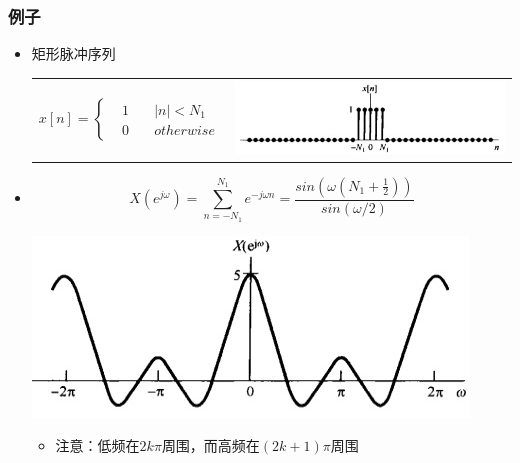 \documentclass[CJKutf8,xcolor=pdftex,dvipsnames,table]{beamer}
\begin{document}
\begin{CJK*}{UTF8}{song}
\begin{frame}
  \end{frame}   
       
  \begin{frame}
    \frametitle{例子}
    \begin{itemize}
    \item 矩形脉冲序列 \\
	\begin{tabular}{ll}
	\raisebox{-.5\height}

    \begin{math}
x[n] = 
\left\{
    \begin {aligned}
         & 1 \quad & |n| < N_1 \\
         & 0 \quad & otherwise                  
    \end{aligned}
\right.
	\end{math}

&
    \includegraphics[valign=m,scale=.4]{ss-c-f5-6a}    \\
    \end{tabular} 
    
    \item
    \[
    X(e^{j\omega}) = \sum_{n=-N_1}^{N_1}e^{-j\omega n} = \frac{sin(\omega (N_1 + \frac{1}{2}))}{sin(\omega /2)}
    \]
    	\begin{center}
    	\includegraphics[scale=.5]{ss-c-f5-6b}
    	\end{center}    
		\begin{itemize}
		\item 注意：低频在$2k\pi$周围，而高频在$(2k+1)\pi$周围
		\end{itemize}
    \end{itemize}


\end{frame}
\end{CJK*}
\end{document}
